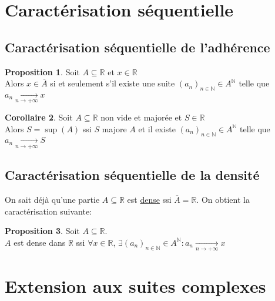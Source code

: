 \documentclass[10pt,a4paper]{article}
\theoremstyle{definition}
\newtheorem{proposition}{Proposition}[section]
\newtheorem{corollaire}[proposition]{Corollaire}
\begin{document}
\section{Caractérisation séquentielle}
\subsection{Caractérisation séquentielle de l'adhérence}
\begin{proposition}
Soit $A \subseteq \mathbb{R}$ et $x \in \mathbb{R}$ \\
Alors $x \in \overline{A}$ si et seulement s'il existe une suite $(a_n)_{n \in \mathbb{N}} \in A^\mathbb{N}$ telle que $a_n \xrightarrow[n \to +\infty]{} x$
\end{proposition}
\begin{corollaire}
Soit $A \subseteq \mathbb{R}$ non vide et majorée et $S \in \mathbb{R}$ \\
Alors $S = \sup(A)$ ssi $S$ majore $A$ et il existe $(a_n)_{n \in \mathbb{N}} \in A^\mathbb{N}$ telle que $a_n \xrightarrow[n \to +\infty]{} S$
\end{corollaire}

\subsection{Caractérisation séquentielle de la densité}
On sait déjà qu'une partie $A \subseteq \mathbb{R}$ est \uline{dense} ssi $\overline{A} = \mathbb{R}$. On obtient la caractérisation suivante:
\begin{proposition}
Soit $A \subseteq \mathbb{R}$. \\
$A$ est dense dans $\mathbb{R}$ ssi $\forall x \in \mathbb{R}$, $\exists (a_n)_{n \in \mathbb{N}} \in A^\mathbb{N}: a_n \xrightarrow[n \to +\infty]{} x$
\end{proposition}

\section{Extension aux suites complexes}
\end{document}
